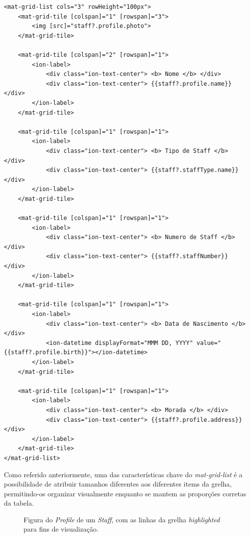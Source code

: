 \begin{lstlisting}
<mat-grid-list cols="3" rowHeight="100px">
	<mat-grid-tile [colspan]="1" [rowspan]="3">
		<img [src]="staff?.profile.photo">
	</mat-grid-tile>
	
	<mat-grid-tile [colspan]="2" [rowspan]="1">
		<ion-label>
			<div class="ion-text-center"> <b> Nome </b> </div>
			<div class="ion-text-center"> {{staff?.profile.name}} </div>
		</ion-label>
	</mat-grid-tile>
	
	<mat-grid-tile [colspan]="1" [rowspan]="1">
		<ion-label>
			<div class="ion-text-center"> <b> Tipo de Staff </b> </div>
			<div class="ion-text-center"> {{staff?.staffType.name}} </div>
		</ion-label>
	</mat-grid-tile>
	
	<mat-grid-tile [colspan]="1" [rowspan]="1">
		<ion-label>
			<div class="ion-text-center"> <b> Numero de Staff </b> </div>
			<div class="ion-text-center"> {{staff?.staffNumber}} </div>
		</ion-label>
	</mat-grid-tile>
	
	<mat-grid-tile [colspan]="1" [rowspan]="1">
		<ion-label>
			<div class="ion-text-center"> <b> Data de Nascimento </b> </div>
			<ion-datetime displayFormat="MMM DD, YYYY" value="{{staff?.profile.birth}}"></ion-datetime>
		</ion-label>
	</mat-grid-tile>
	
	<mat-grid-tile [colspan]="1" [rowspan]="1">
		<ion-label>
			<div class="ion-text-center"> <b> Morada </b> </div>
			<div class="ion-text-center"> {{staff?.profile.address}} </div>
		</ion-label>
	</mat-grid-tile>
</mat-grid-list>

\end{lstlisting}

Como referido anteriormente, uma das características chave do \textit{mat-grid-list} é a possibilidade de atribuir tamanhos diferentes aos diferentes items da grelha, permitindo-os organizar visualmente enquanto se mantem as proporções corretas da tabela. 

\begin{figure}[h]
	\begin{center}
	\end{center}
	\caption{Figura do \textit{Profile} de um \textit{Staff}, com as linhas da grelha \textit{highlighted} para fins de visualização. }\label{fig:calendarall}
\end{figure}

